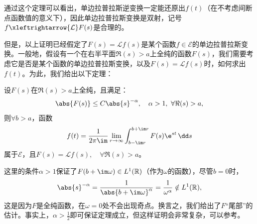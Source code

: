 通过这个定理可以看出，单边拉普拉斯逆变换一定能还原出$f(t)$（在不考虑间断点函数值的意义下），因此单边拉普拉斯变换是双射，记号$f\xleftrightarrow{\mathcal{L}}F(s)$是合理的。

但是，以上证明已经假定了$F(s)=\mathcal{L}f(s)$是某个函数$f\in\mathcal{E}$的单边拉普拉斯变换。一般地，假设有一个在右半平面$\Re(s)>a$上全纯的函数$F(s)$，我们需要考虑它是否是某个函数的单边拉普拉斯变换，以及$F(s)=\mathcal{L}f(s)$时，如何求出$f(t)$。为此，我们给出以下定理\cite{distribution}：
\begin{theorem}[*单边拉普拉斯反演公式]
    \label{thm:laplace_inversion_1}
    设$F(s)$在$\Re(s)>a$上全纯，且满足：
    \begin{equation}
        \abs{F(s)}\leq C\abs{s}^{-\alpha},\quad \alpha>1,\ \forall\Re(s)>a,
    \end{equation}
    则$\forall b>a$，函数
    \begin{equation}
        f(t)=\frac{1}{2\pi\im}\lim_{r\to\infty}\int_{b-\im r}^{b+\im r}F(s)\e^{st}\,\dd s
    \end{equation}
    属于$\mathcal{E}$，且$F(s)=\mathcal{L}f(s),\quad \forall\Re(s)>a$。
\end{theorem}
\begin{remark}
    这里的条件$\alpha>1$保证了$F(b+\im\omega)\in L^1(\mathbb{R})$（作为$\omega$的函数），尽管$b=0$时，
    \begin{equation}
        \abs{s}^{-\alpha}=\frac{1}{\abs{b+\im\omega}^{\alpha}}=\frac{1}{\omega^{\alpha}}\notin L^1(\mathbb{R}),
    \end{equation}
    这是因为$F$是全纯函数，在$\omega=0$处不会出现奇点。换言之，我们给出了$F$“尾部”的估计。事实上，$\displaystyle\alpha>\frac{1}{2}$即可保证定理成立，但这样证明会非常复杂，可以参考\cite{folland}。
\end{remark}
